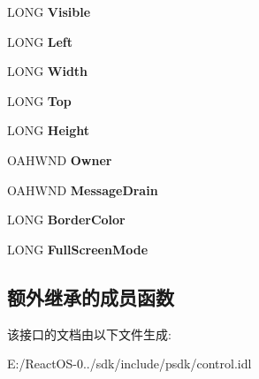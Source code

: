 \begin{DoxyCompactItemize}
L\+O\+NG {\bfseries Visible}
\item 
\mbox{\label{interface_quartz_type_lib_1_1_i_video_window_a57518069d987826af4f92bc00adcb141}} 
L\+O\+NG {\bfseries Left}
\item 
\mbox{\label{interface_quartz_type_lib_1_1_i_video_window_afc51315a28280b279930b1a4c04ac51d}} 
L\+O\+NG {\bfseries Width}
\item 
\mbox{\label{interface_quartz_type_lib_1_1_i_video_window_ab64ad11f0ccb22cf11baa02d7298ce5b}} 
L\+O\+NG {\bfseries Top}
\item 
\mbox{\label{interface_quartz_type_lib_1_1_i_video_window_a988b9ce9d082275fdc802c488ff0153e}} 
L\+O\+NG {\bfseries Height}
\item 
\mbox{\label{interface_quartz_type_lib_1_1_i_video_window_ab44cbcf34a37442529229f9431ab7007}} 
O\+A\+H\+W\+ND {\bfseries Owner}
\item 
\mbox{\label{interface_quartz_type_lib_1_1_i_video_window_a5edb721049eecc8fbbad241587c1f771}} 
O\+A\+H\+W\+ND {\bfseries Message\+Drain}
\item 
\mbox{\label{interface_quartz_type_lib_1_1_i_video_window_a865cdb345ed5da0741837a2094cf5800}} 
L\+O\+NG {\bfseries Border\+Color}
\item 
\mbox{\label{interface_quartz_type_lib_1_1_i_video_window_aa6ea07c89666ffb2fb6207c1e75d541f}} 
L\+O\+NG {\bfseries Full\+Screen\+Mode}
\end{DoxyCompactItemize}
\subsection*{额外继承的成员函数}


该接口的文档由以下文件生成\+:\begin{DoxyCompactItemize}
\item 
E\+:/\+React\+O\+S-\/0../sdk/include/psdk/control.\+idl\end{DoxyCompactItemize}
